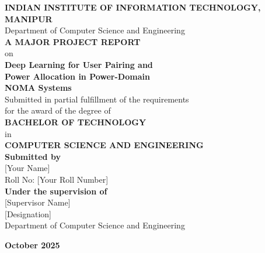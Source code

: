 \begin{titlepage}
    \centering
    
    \vspace*{1cm}
    
    
    {\Large\bfseries INDIAN INSTITUTE OF INFORMATION TECHNOLOGY, MANIPUR}\\[0.5cm]
    {\large Department of Computer Science and Engineering}\\[2cm]
    
    {\huge\bfseries A MAJOR PROJECT REPORT}\\[0.5cm]
    {\LARGE on}\\[1cm]
    
    {\Huge\bfseries Deep Learning for User Pairing and \\[0.3cm] Power Allocation in Power-Domain \\[0.3cm] NOMA Systems}\\[2cm]
    
    {\Large Submitted in partial fulfillment of the requirements\\[0.2cm]
    for the award of the degree of}\\[0.5cm]
    
    {\Large\bfseries BACHELOR OF TECHNOLOGY}\\[0.2cm]
    {\Large in}\\[0.2cm]
    {\Large\bfseries COMPUTER SCIENCE AND ENGINEERING}\\[2cm]
    
    {\large\bfseries Submitted by}\\[0.5cm]
    {\Large [Your Name]}\\[0.2cm]
    {\large Roll No: [Your Roll Number]}\\[2cm]
    
    {\large\bfseries Under the supervision of}\\[0.5cm]
    {\Large [Supervisor Name]}\\[0.2cm]
    {\large [Designation]}\\[0.2cm]
    {\large Department of Computer Science and Engineering}\\[2cm]
    
    \vfill
    
    {\large\bfseries October 2025}
    
\end{titlepage}
\newpage
